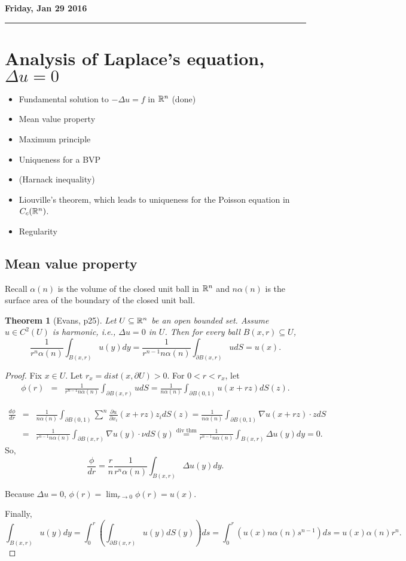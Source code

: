 \documentclass[11pt]{amsart}%
\newtheorem{theorem}{Theorem}
\begin{document}
\textbf{Friday, Jan 29 2016}

\begin{center}\rule{0.5\linewidth}{\linethickness}\end{center}
\section*{Analysis of Laplace's equation, $\Delta u =0$}
\begin{itemize}
    \item Fundamental solution to $-\Delta u =f$ in $\mathbb{R}^n$ (done)
    \item Mean value property
    \item Maximum principle
    \item Uniqueness for a BVP
    \item (Harnack inequality)
    \item Liouville's theorem, which leads to uniqueness for the Poisson equation in $C_c(\mathbb{R}^n)$.
    \item Regularity
\end{itemize}

\subsection*{Mean value property}
Recall $\alpha(n)$ is the volume of the closed unit ball in $\mathbb{R}^n$ and $n\alpha(n)$ is the surface area of the boundary of the closed unit ball.

\begin{theorem}[Evans, p25]
    Let $U\subseteq \mathbb{R}^n$ be an open bounded set. Assume $u\in C^2(U)$ is harmonic, i.e., $\Delta u =0$ in $U$. Then for every ball $B(x,r)\subseteq U$,
    $$\frac{1}{r^n\alpha(n)}\int_{B(x,r)} u(y)dy = \frac{1}{r^{n-1} n\alpha(n)}\int_{\partial B(x,r)} u dS = u(x).$$
\end{theorem}
\begin{proof}
    Fix $x\in U$. Let $r_x=dist(x,\partial U)>0$. For $0<r<r_x$, let
    \begin{eqnarray*}
        \phi(r) &=&\frac{1}{r^{n-1}n\alpha(n)}\int_{\partial B(x,r)} u dS = \frac{1}{n\alpha(n)}\int_{\partial B(0,1)} u(x+rz) dS(z).
    \end{eqnarray*}
    
    \begin{eqnarray*}
        \frac{d\phi}{dr}    &=& \frac{1}{n\alpha(n)}\int_{\partial B(0,1)} \sum^n\frac{\partial u}{\partial x_i}(x+rz)z_i dS(z)=\frac{1}{n\alpha(n)}\int_{\partial B(0,1)} \nabla u(x+rz)\cdot z dS\\
            &=& \frac{1}{r^{n-1}n\alpha(n)}\int_{\partial B(x,r)}\nabla u(y)\cdot \nu dS(y) \stackrel{\text{div thm}}{=} \frac{1}{r^{n-1}n\alpha(n)}\int_{B(x,r)}\Delta u(y) dy =0.
    \end{eqnarray*}
    So,
    \[ \frac{\phi}{dr} = \frac{r}{n}\frac{1}{r^n\alpha(n)}\int_{B(x,r)} \Delta u(y)dy. \tag{*} \]
    
    Because $\Delta u =0$, $\phi(r)=\lim_{r\to 0} \phi(r)=u(x)$.
    
    Finally, $$\int_{B(x,r)} u(y)dy =\int_0^r(\int_{\partial B(x,r)} u(y) dS(y))ds=\int_0^r (u(x)n\alpha(n)s^{n-1})ds = u(x)\alpha(n)r^n.$$
\end{proof}
\end{document}
